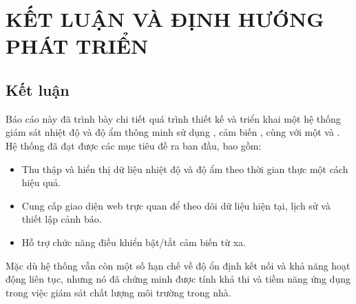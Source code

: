 
\chapter{KẾT LUẬN VÀ ĐỊNH HƯỚNG PHÁT TRIỂN} %

\label{Chapter4} %


\section{Kết luận}
Báo cáo này đã trình bày chi tiết quá trình thiết kế và triển khai một hệ thống giám sát nhiệt độ và độ ẩm thông minh sử dụng , cảm biến , cùng với một   và  . Hệ thống đã đạt được các mục tiêu đề ra ban đầu, bao gồm:
\begin{itemize}
	\item Thu thập và hiển thị dữ liệu nhiệt độ và độ ẩm theo thời gian thực một cách hiệu quả.
	\item Cung cấp giao diện web trực quan để theo dõi dữ liệu hiện tại, lịch sử và thiết lập cảnh báo.
	\item Hỗ trợ chức năng điều khiển bật/tắt cảm biến từ xa.
\end{itemize}
Mặc dù hệ thống vẫn còn một số hạn chế về độ ổn định kết nối và khả năng hoạt động liên tục, nhưng nó đã chứng minh được tính khả thi và tiềm năng ứng dụng trong việc giám sát chất lượng môi trường trong nhà.

